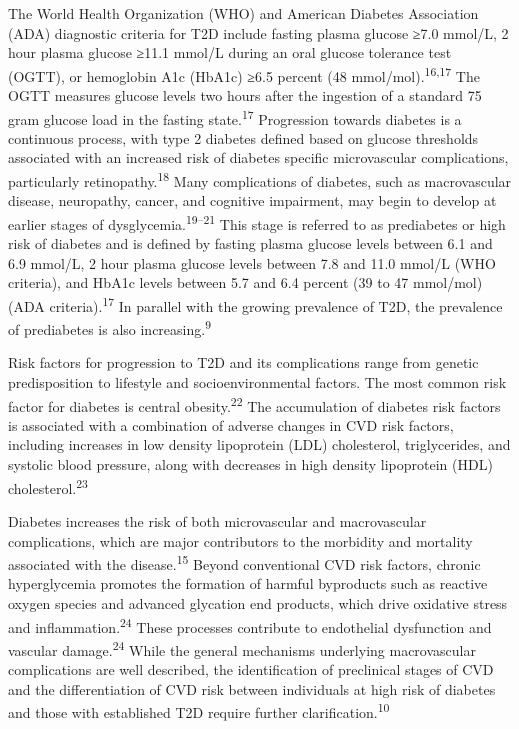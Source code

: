 \documentclass[
  a4paper,
  headsepline=true,
  open=any]{scrbook}
\begin{document}
The World Health Organization (WHO) and American Diabetes Association
(ADA) diagnostic criteria for T2D include fasting plasma glucose ≥7.0
mmol/L, 2 hour plasma glucose ≥11.1 mmol/L during an oral glucose
tolerance test (OGTT), or hemoglobin A1c (HbA1c) ≥6.5 percent (48
mmol/mol).\textsuperscript{16,17} The OGTT measures glucose levels two
hours after the ingestion of a standard 75 gram glucose load in the
fasting state.\textsuperscript{17} Progression towards diabetes is a
continuous process, with type 2 diabetes defined based on glucose
thresholds associated with an increased risk of diabetes specific
microvascular complications, particularly
retinopathy.\textsuperscript{18} Many complications of diabetes, such as
macrovascular disease, neuropathy, cancer, and cognitive impairment, may
begin to develop at earlier stages of
dysglycemia.\textsuperscript{19--21} This stage is referred to as
prediabetes or high risk of diabetes and is defined by fasting plasma
glucose levels between 6.1 and 6.9 mmol/L, 2 hour plasma glucose levels
between 7.8 and 11.0 mmol/L (WHO criteria), and HbA1c levels between 5.7
and 6.4 percent (39 to 47 mmol/mol) (ADA criteria).\textsuperscript{17}
In parallel with the growing prevalence of T2D, the prevalence of
prediabetes is also increasing.\textsuperscript{9}

Risk factors for progression to T2D and its complications range from
genetic predisposition to lifestyle and socioenvironmental factors. The
most common risk factor for diabetes is central
obesity.\textsuperscript{22} The accumulation of diabetes risk factors
is associated with a combination of adverse changes in CVD risk factors,
including increases in low density lipoprotein (LDL) cholesterol,
triglycerides, and systolic blood pressure, along with decreases in high
density lipoprotein (HDL) cholesterol.\textsuperscript{23}

Diabetes increases the risk of both microvascular and macrovascular
complications, which are major contributors to the morbidity and
mortality associated with the disease.\textsuperscript{15} Beyond
conventional CVD risk factors, chronic hyperglycemia promotes the
formation of harmful byproducts such as reactive oxygen species and
advanced glycation end products, which drive oxidative stress and
inflammation.\textsuperscript{24} These processes contribute to
endothelial dysfunction and vascular damage.\textsuperscript{24} While
the general mechanisms underlying macrovascular complications are well
described, the identification of preclinical stages of CVD and the
differentiation of CVD risk between individuals at high risk of diabetes
and those with established T2D require further
clarification.\textsuperscript{10}
\end{document}
